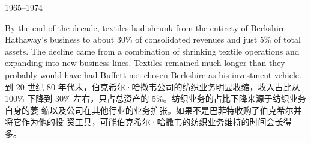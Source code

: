 \begin{section}{1965--1974}
\begin{verseparallel}
  {
    By the end of the decade, textiles had shrunk from the entirety of Berkshire
    Hathaway's business to about 30\% of consolidated revenues and just 5\% of
    total assets. The decline came from a combination of shrinking textile
    operations and expanding into new business lines. Textiles remained much
    longer than they probably would have had Buffett not chosen Berkshire as his
    investment vehicle. \\
  }
  {
    到 20 世纪 80 年代末，伯克希尔·哈撒韦公司的纺织业务明显收缩，收入占比从100\%
    下降到 30\% 左右，只占总资产的 5\%。纺织业务的占比下降来源于纺织业务自身的萎
    缩以及公司在其他行业的业务扩张。如果不是巴菲特收购了伯克希尔并将它作为他的投
    资工具，可能伯克希尔·哈撒韦的纺织业务维持的时间会长得多。
  }
\end{verseparallel}
\end{section}

